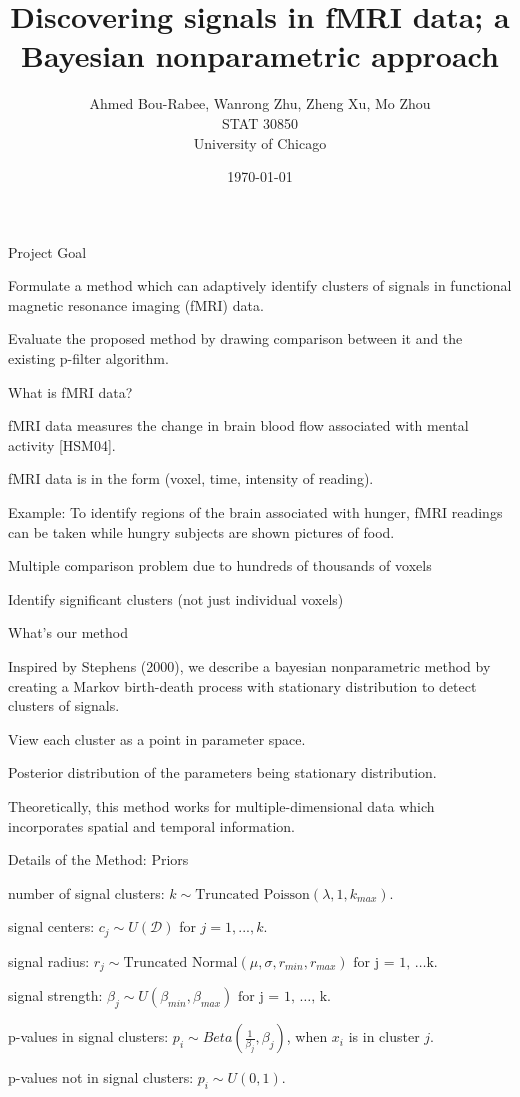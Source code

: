 \documentclass[10pt,mathserif]{beamer}
\title{\large \bfseries Discovering signals in fMRI data; 
a Bayesian nonparametric approach }
\author{Ahmed Bou-Rabee, Wanrong Zhu, Zheng Xu, Mo Zhou\\[3ex]
STAT 30850\\
University of Chicago}
\date{\today}
\begin{document}
\frame{
\thispagestyle{empty}
\titlepage
}

\begin{frame} {Project Goal}
\BIT
\item  Formulate a method which can adaptively identify clusters of signals in functional magnetic resonance imaging (fMRI) data.
\item  Evaluate the proposed method by drawing comparison between it and the existing p-filter algorithm.
\EIT
\end{frame}

\begin{frame} {What is fMRI data?}
\BIT
\item  fMRI data measures the change in brain blood flow associated with mental activity [HSM04].
\item  fMRI data is in the form (voxel, time, intensity of reading).
\item  Example: To identify regions of the brain associated with hunger, fMRI readings can be taken while hungry subjects are shown pictures of food.
\item  Multiple comparison problem due to hundreds of thousands of voxels 
\item  Identify significant clusters (not just individual voxels)
\EIT
\end{frame}

\begin{frame} {What's our method}
\BIT
\item  Inspired by Stephens (2000), we describe a bayesian nonparametric method by creating a Markov birth-death process with stationary distribution to detect clusters of signals. 
\item View each cluster as a point in parameter space.
\item Posterior distribution of the parameters being stationary distribution.
\item Theoretically, this method works for multiple-dimensional data which incorporates spatial and temporal information.

\EIT
\end{frame}

\begin{frame} {Details of the Method: Priors}
\BIT
\item number of signal clusters:  $k \sim \mbox{Truncated Poisson}(\lambda,  1, k_{max})$.
\item signal centers:   $c_j \sim U \mathcal{(D)}$ for $j = 1, ... , k$.
\item signal radius:  $r_j \sim \mbox{Truncated Normal}(\mu,\sigma,r_{min},r_{max}) \mbox{ for j = 1, \ldots k} $.
\item signal strength:  $\beta_j \sim U(\beta_{min},\beta_{max}) \mbox{ for j = 1, \ldots, k} $.
\item p-values in signal clusters:  $p_i \sim Beta(\frac{1}{\beta_j}, \beta_j)$, when $x_i$ is in cluster $j$.
\item p-values not in signal clusters:  $p_i \sim U(0,1)$.
\EIT
\end{frame}
\end{document}
